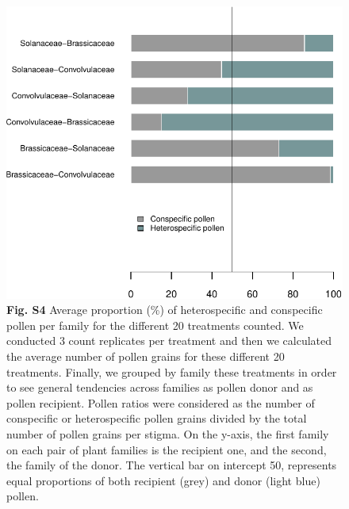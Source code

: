 \documentclass[12pt,]{article}
\begin{document}
\begin{figure}
\centering
\includegraphics{Supp_Material_files/figure-latex/unnamed-chunk-13-1.pdf}
\caption{\textbf{Fig. S4} Average proportion (\%) of heterospecific and
conspecific pollen per family for the different 20 treatments counted.
We conducted 3 count replicates per treatment and then we calculated the
average number of pollen grains for these different 20 treatments.
Finally, we grouped by family these treatments in order to see general
tendencies across families as pollen donor and as pollen recipient.
Pollen ratios were considered as the number of conspecific or
heterospecific pollen grains divided by the total number of pollen
grains per stigma. On the y-axis, the first family on each pair of plant
families is the recipient one, and the second, the family of the donor.
The vertical bar on intercept 50, represents equal proportions of both
recipient (grey) and donor (light blue) pollen.}
\end{figure}

\clearpage
\end{document}
